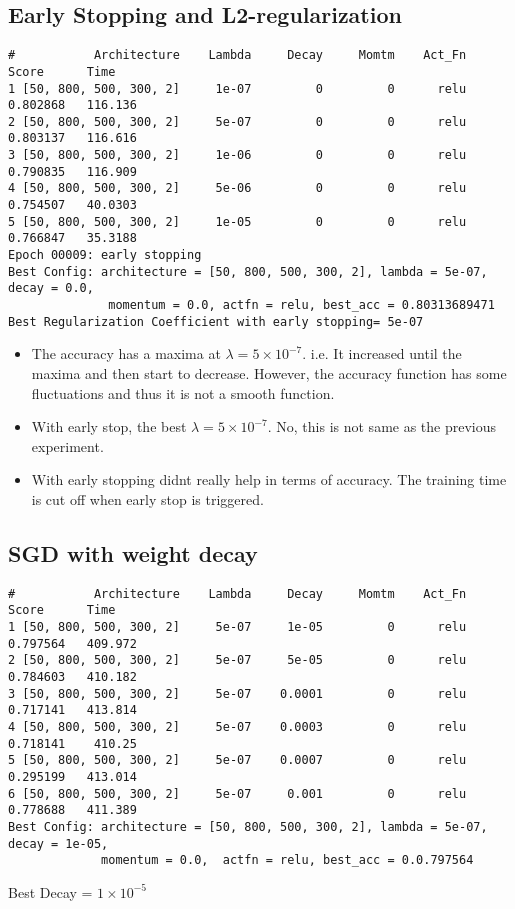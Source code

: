 \documentclass[letter,doc,notimes]{article}
\begin{document}
\subsection{Early Stopping and L2-regularization}
\begin{verbatim}
#           Architecture    Lambda     Decay     Momtm    Act_Fn     Score      Time
1 [50, 800, 500, 300, 2]     1e-07         0         0      relu  0.802868   116.136
2 [50, 800, 500, 300, 2]     5e-07         0         0      relu  0.803137   116.616
3 [50, 800, 500, 300, 2]     1e-06         0         0      relu  0.790835   116.909
4 [50, 800, 500, 300, 2]     5e-06         0         0      relu  0.754507   40.0303
5 [50, 800, 500, 300, 2]     1e-05         0         0      relu  0.766847   35.3188
Epoch 00009: early stopping
Best Config: architecture = [50, 800, 500, 300, 2], lambda = 5e-07, decay = 0.0,
              momentum = 0.0, actfn = relu, best_acc = 0.80313689471
Best Regularization Coefficient with early stopping= 5e-07
\end{verbatim}
\begin{itemize}
	\item The accuracy has a maxima at $\lambda = 5 \times 10^{-7 } $. i.e. It increased until the maxima and then start to decrease. However, the accuracy function has some fluctuations and thus it is not a smooth function.
	\item With early stop, the best $\lambda = 5\times10^{-7 }$. No, this is not same as the previous experiment.
  \item With early stopping didnt really help in terms of accuracy. The training time is cut off when early stop is triggered.
\end{itemize}

\subsection{ SGD with weight decay}
\begin{verbatim}
#           Architecture    Lambda     Decay     Momtm    Act_Fn     Score      Time
1 [50, 800, 500, 300, 2]     5e-07     1e-05         0      relu  0.797564   409.972
2 [50, 800, 500, 300, 2]     5e-07     5e-05         0      relu  0.784603   410.182
3 [50, 800, 500, 300, 2]     5e-07    0.0001         0      relu  0.717141   413.814
4 [50, 800, 500, 300, 2]     5e-07    0.0003         0      relu  0.718141    410.25
5 [50, 800, 500, 300, 2]     5e-07    0.0007         0      relu  0.295199   413.014
6 [50, 800, 500, 300, 2]     5e-07     0.001         0      relu  0.778688   411.389
Best Config: architecture = [50, 800, 500, 300, 2], lambda = 5e-07, decay = 1e-05, 
             momentum = 0.0,  actfn = relu, best_acc = 0.0.797564
\end{verbatim}
Best Decay =  $1\times 10^{-5}$
\end{document}
